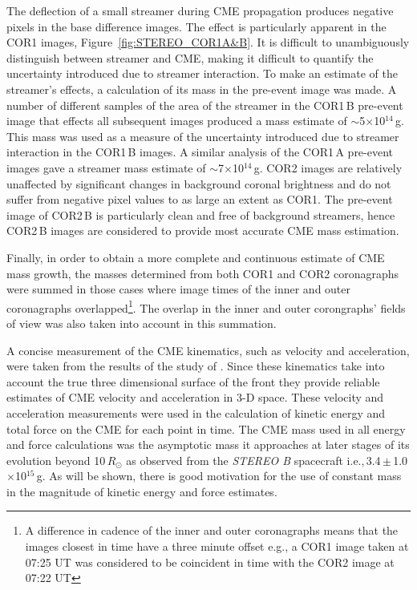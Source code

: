 The deflection of a small streamer during CME propagation produces negative pixels in the base difference images. The effect is particularly 
apparent in the COR1 images, Figure~\ref{fig:STEREO_COR1A&B}. It is difficult to unambiguously distinguish between streamer and CME, making 
it difficult to quantify the uncertainty introduced due to streamer interaction. To make an estimate of the streamer's effects, a calculation of its mass 
in the pre-event image was made. A number of different samples of the area of the streamer in the COR1\,B pre-event image that effects all 
subsequent images produced a mass estimate of $\sim$5$\times$10$^{14}$\,g. This mass was used as a measure of the uncertainty introduced 
due to streamer interaction in the COR1\,B images. A similar analysis of the COR1\,A pre-event images gave a streamer mass estimate of 
$\sim$7$\times$10$^{14}$\,g. COR2 images are relatively unaffected by significant changes in background coronal brightness and do not suffer 
from negative pixel values to as large an extent as COR1. The pre-event image of COR2\,B is particularly clean and free of background streamers, 
hence COR2\,B images are considered to provide most accurate CME mass estimation.

Finally, in order to obtain a more complete and continuous estimate of CME mass growth, the masses determined from both COR1 and COR2 
coronagraphs were summed in those cases where image times of the inner and outer coronagraphs overlapped\footnote{A difference in cadence of 
the inner and outer coronagraphs means that the images closest in time have a three minute offset e.g., a COR1 image taken at 07:25 UT was 
considered to be coincident in time with the COR2 image at 07:22 UT}. The overlap in the inner and outer corongraphs' fields of view was also 
taken into account in this summation.


A concise measurement of the CME kinematics, such as velocity and acceleration, were taken from the results of the study of \citet{byr10}. Since 
these kinematics take into account the true three dimensional surface of the front they provide reliable estimates of CME velocity and acceleration 
in 3-D space. These velocity and acceleration measurements were used in the calculation of kinetic energy and total force on the CME for each 
point in time. The CME mass used in all energy and force calculations was the asymptotic mass it approaches at later stages of its evolution 
beyond 10\,$R_{\odot}$ as observed from the \emph{STEREO B} spacecraft i.e.,\,3.4\,$\pm$\,1.0$\times$10$^{15}$\,g. As will be shown, there is 
good motivation for the use of constant mass in the magnitude of kinetic energy and force estimates. 


